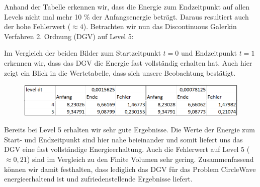 Anhand der Tabelle erkennen wir, dass die Energie zum Endzeitpunkt auf allen Levels nicht mal mehr 10 \% der Anfangsenergie beträgt. Daraus resultiert auch der hohe Fehlerwert ($\approx 4$). 
Betrachten wir nun das Discontinuous Galerkin Verfahren 2. Ordnung (DGV) auf Level 5:

\begin{figure}[H]
	\centering
\end{figure}

Im Vergleich der beiden Bilder zum Startzeitpunkt $t=0$ und Endzeitpunkt $t=1$ erkennen wir, dass das DGV die Energie fast vollständig erhalten hat. Auch hier zeigt ein Blick in die Wertetabelle, dass sich unsere Beobachtung bestätigt.

\begin{figure}[H]
	\centering
	\includegraphics[width=\textwidth]{../Aufgabe21/deg=2CircleWaveEnergieTabelle.png}
\end{figure}

Bereits bei Level 5 erhalten wir sehr gute Ergebnisse.
Die Werte der Energie zum Start- und Endzeitpunkt sind hier nahe beieinander und somit liefert uns das DGV eine fast vollständige Energieerhaltung. Auch die Fehlerwert auf Level 5 ($\approx 0,21$) sind im Vergleich zu den Finite Volumen sehr gering. Zusammenfassend können wir damit festhalten, dass lediglich das DGV für das Problem CircleWave energieerhaltend ist und zufriedenstellende Ergebnisse liefert.



